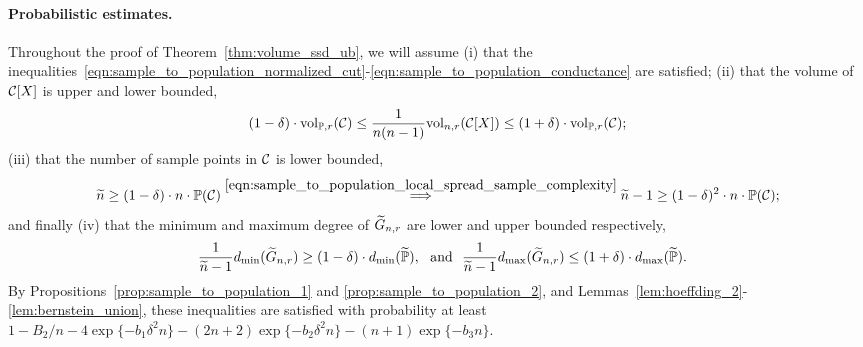 \paragraph{Probabilistic estimates.}
Throughout the proof of Theorem~\ref{thm:volume_ssd_ub}, we will assume (i) that the inequalities~\eqref{eqn:sample_to_population_normalized_cut}-\eqref{eqn:sample_to_population_conductance} are satisfied; (ii) that the volume of $\mathcal{C}[X]$ is upper and lower bounded,
\begin{equation}
\label{pf:volume_ssd_ub_1}
(1 - \delta) \cdot \mathrm{vol}_{\mathbb{P},r}(\mathcal{C}) \leq \frac{1}{n(n-1)}\mathrm{vol}_{n,r}(\mathcal{C}[X]) \leq (1 + \delta) \cdot \mathrm{vol}_{\mathbb{P},r}(\mathcal{C});
\end{equation}
(iii) that the number of sample points in $\mathcal{C}$ is lower bounded,
\begin{equation}
\label{pf:volume_ssd_ub_2}
\widetilde{n} \geq (1 - \delta) \cdot n \cdot \mathbb{P}(\mathcal{C}) \overset{\eqref{eqn:sample_to_population_local_spread_sample_complexity}}{\Longrightarrow} \widetilde{n} - 1 \geq (1 - \delta)^2 \cdot n \cdot \mathbb{P}(\mathcal{C});
\end{equation}
and finally (iv) that the minimum and maximum degree of $\widetilde{G}_{n,r}$ are lower and upper bounded respectively,
\begin{equation}
\label{pf:volume_ssd_ub_3}
~~\frac{1}{\widetilde{n} - 1} d_{\min}(\widetilde{G}_{n,r}) \geq (1 - \delta) \cdot d_{\min}(\widetilde{\mathbb{P}}),~~\textrm{and}~~\frac{1}{\widetilde{n} - 1} d_{\max}(\widetilde{G}_{n,r}) \leq (1 + \delta) \cdot d_{\max}(\widetilde{\mathbb{P}}).
\end{equation}
By Propositions~\ref{prop:sample_to_population_1} and \ref{prop:sample_to_population_2}, and Lemmas~\ref{lem:hoeffding_2}-\ref{lem:bernstein_union}, these inequalities are satisfied with probability at least $1 - B_2/n - 4\exp\{-b_1\delta^2n\} - (2n + 2)\exp\{-b_2\delta^2n\} - (n + 1)\exp\{-b_3n\}$.


